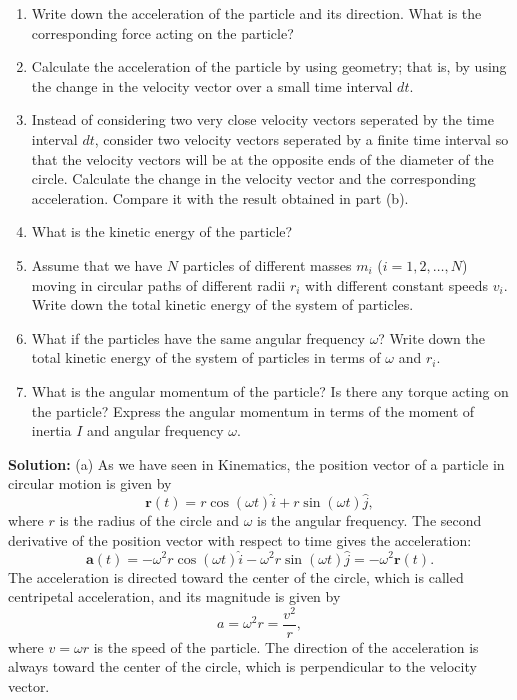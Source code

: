 \documentclass[12pt]{article}
\begin{document}
\begin{enumerate}
    \item[(a)] Write down the acceleration of the particle and its direction. What is the corresponding force acting on the particle?
    \item[(b)] Calculate the acceleration of the particle by using geometry; that is, by using the change in the velocity vector over a small time interval $dt$. 
    \item[(c)] Instead of considering two very close velocity vectors seperated by the time interval $dt$, consider two velocity vectors seperated by a finite time interval so that the velocity vectors will be at the opposite ends of the diameter of the circle. Calculate the change in the velocity vector and the corresponding acceleration. Compare it with the result obtained in part (b).
    \item[(c)] What is the kinetic energy of the particle? 
    \item[(d)] Assume that we have $N$ particles of different masses $m_i$ ($i = 1, 2, \ldots, N$) moving in circular paths of different radii $r_i$ with different constant speeds $v_i$. Write down the total kinetic energy of the system of particles.
    \item[(e)] What if the particles have the same angular frequency $\omega$? Write down the total kinetic energy of the system of particles in terms of $\omega$ and $r_i$.
    \item[(f)] What is the angular momentum of the particle? Is there any torque acting on the particle?  Express the angular momentum in terms of the moment of inertia $I$ and angular frequency $\omega$.

\end{enumerate}

\textbf{Solution:} 
(a) As we have seen in Kinematics, the position vector of a particle in circular motion is given by
\begin{equation}
    \mathbf{r}(t) = r \cos(\omega t) \hat{i} + r \sin(\omega t) \hat{j},
\end{equation}
where $r$ is the radius of the circle and $\omega$ is the angular frequency. The second derivative of the position vector with respect to time gives the acceleration:
\begin{equation}
    \mathbf{a}(t) = -\omega^2 r \cos(\omega t) \hat{i} - \omega^2 r \sin(\omega t) \hat{j} = -\omega^2 \mathbf{r}(t).
\end{equation}
The acceleration is directed toward the center of the circle, which is called centripetal acceleration, and its magnitude is given by
\begin{equation}
    a = \omega^2 r = \frac{v^2}{r},
\end{equation}
where $v = \omega r$ is the speed of the particle. The direction of the acceleration is always toward the center of the circle, which is perpendicular to the velocity vector.
\end{document}
